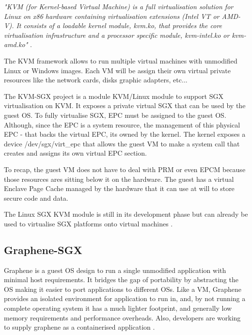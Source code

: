 \textit{"\gls{KVM} (for Kernel-based Virtual Machine) is a full virtualisation solution for Linux on x86 hardware containing virtualisation extensions (Intel VT or AMD-V). It consists of a loadable kernel module, kvm.ko, that provides the core virtualisation infrastructure and a processor specific module, kvm-intel.ko or kvm-amd.ko"} \cite{kvm:1}.

The \gls{KVM} framework allows to run multiple virtual machines with unmodified Linux or Windows images. Each \gls{VM} will be assign their own virtual private resources like the network cards, disks graphic adapters, etc...

The KVM-SGX project is a module KVM/Linux module to support SGX virtualisation on \gls{KVM}. It exposes a private virtual SGX that can be used by the guest \gls{OS}.
To fully virtualise \gls{SGX}, \gls{EPC} must be assigned to the guest \gls{OS}. Although, since the \gls{EPC} is a system resource, the management of this physical \gls{EPC} - that backs the virtual \gls{EPC}, its owned by the kernel. The kernel exposes a device /dev/sgx/virt\_epc that allows the guest \gls{VM} to make a system call that creates and assigns its own virtual \gls{EPC} section.

To recap, the guest \gls{VM} does not have to deal with \gls{PRM} or even \gls{EPCM} because those resources ares sitting below it on the hardware. The guest has a virtual Enclave Page Cache managed by the hardware that it can use at will to store secure code and data.

The Linux \gls{SGX} \gls{KVM} module is still in its development phase but can already be used to virtualise \gls{SGX} platforms onto virtual machines \cite{kvm-sgx:1, kvm-sgx:2, kvm-sgx:3}.

\subsection{Graphene-SGX}
\label{ssec:graphene-sgx}

Graphene \cite{graphene:1, graphene:2, graphene:4} is a guest OS design to run a single unmodified application with minimal host requirements. It bridges the gap of portability by abstracting the \gls{OS} making it easier to port applications to different \glspl{OS}. Like a \gls{VM}, Graphene provides an isolated environment for application to run in, and, by not running a complete operating system it has a much lighter footprint, and generally low memory requirements and performance overheads. Also, developers are working to supply graphene as a containerised application \cite{graphene_container:1}. 

